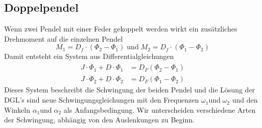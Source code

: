 \subsection{Doppelpendel}
Wenn zwei Pendel mit einer Feder gekoppelt werden wirkt ein zusätzliches Drehmoment auf die einzelnen Pendel 
\begin{equation*}
    M_1 = D_f\cdot (\Phi_2-\Phi_1)\; \text{und} \;M_2=D_f\cdot (\Phi_1-\Phi_2)
\end{equation*}
Damit entsteht ein System aus Differentialgleichungen
\begin{align*}
    J\cdot \ddot{\Phi}_1 + D \cdot \Phi_1 &= D_F (\Phi_2 - \Phi_1) \\
    J\cdot \ddot{\Phi}_2 + D \cdot \Phi_2 &= D_F (\Phi_1 - \Phi_2)
\end{align*}
Dieses System beschreibt die Schwingung der beiden Pendel und die Lösung der DGL's sind neue Schwingungsgleichungen mit den Frequenzen $\omega_1 \text{und} \;\omega_2$ und den  Winkeln $\alpha_1 \text{und}\; \alpha_2$ als Anfangsbedingung.
Wir unterscheiden verschiedene Arten der Schwingung, abhängig von den Auslenkungen zu Beginn.
